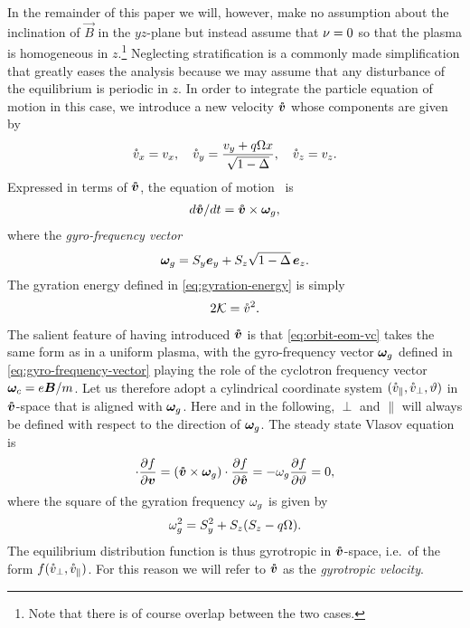 \documentclass[aps,pre,notitlepage,amsmath,amssymb,amsfonts,nobibnotes,nofootinbib,superscriptaddress]{revtex4-1}
\begin{document}
In the remainder of this paper we will, however, make no assumption about the
inclination of $\vec{B}$ in the $yz$-plane but instead assume that $\nu=0$
so that the plasma is homogeneous in $z$.\footnote{Note that there is of
  course overlap between the two cases.} Neglecting stratification is a
commonly made simplification that greatly eases the analysis because we may
assume that any disturbance of the equilibrium is periodic in $z$. In order to
integrate the particle equation of motion in this case, we introduce a new
velocity $\bm{\mathring{v}}$ whose components are given by
\begin{equation}
  \label{eq:gyrotropic-velocity}
  \vc_x = v_x,\quad
  \vc_y = \frac{v_y + q\Omega x}{\sqrt{1-\Delta}},\quad
  \vc_z = v_z.
\end{equation}
Expressed in terms of $\bm{\mathring{v}}$, the equation of
motion~ is
\begin{align}
  \label{eq:orbit-eom-vc}
  d\vvc/dt = \vvc\times\vomg,
\end{align}
where the \emph{gyro-frequency vector}
\begin{equation}
  \label{eq:gyro-frequency-vector}
  \vomg = S_y\ey + S_z\sqrt{1-\Delta}\,\ez.
\end{equation}
The gyration energy defined in \cref{eq:gyration-energy} is simply
\begin{equation}
  \label{eq:gyration-energy-vc}
  2\mathcal{K} = \vc^2.
\end{equation}

The salient feature of having introduced $\bm{\mathring{v}}$ is that \cref{eq:orbit-eom-vc}
takes the same form as in a uniform plasma, with the gyro-frequency vector
$\bm{\omega}_g$ defined in \cref{eq:gyro-frequency-vector} playing the role of the
cyclotron frequency vector $\bm{\omega}_c=e\bm{B}/m$. Let us therefore adopt a
cylindrical coordinate system $(\mathring{v}_\parallel,\mathring{v}_\perp,\vartheta)$ in
$\bm{\mathring{v}}$-space that is aligned with $\bm{\omega}_g$. Here and in the following, $\perp$
and $\parallel$ will always be defined with respect to the direction of
$\bm{\omega}_g$. The steady state Vlasov equation is
\begin{equation}
  [(\vec{v} + q\Omega x\ey)\times\vec{S}]\cdot\pder{f}{\vec{v}}
  = (\vvc\times\vomg)\cdot\pder{f}{\vvc} = -\omg\pder{f}{\vartheta} = 0,
\end{equation}
where the square of the gyration frequency $\omega_g$ is given by
\begin{equation}
  \label{eq:gyro-frequency}
  \omg^2 = S_y^2 + S_z(S_z - q\Omega).
\end{equation}
The equilibrium distribution function is thus gyrotropic in $\bm{\mathring{v}}$-space,
i.e.\ of the form $f(\mathring{v}_\perp,\mathring{v}_\parallel)$. For this reason we will refer
to $\bm{\mathring{v}}$ as the \emph{gyrotropic velocity}.
\end{document}
